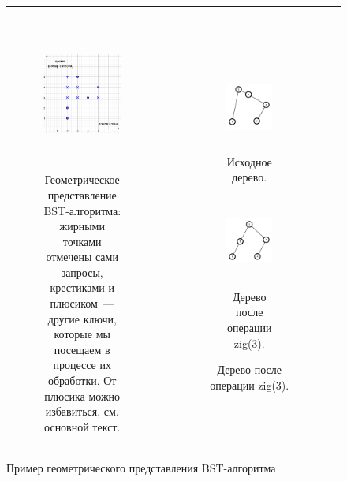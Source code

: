 \begin{figure}
	\centering
	\begin{tabular}{cc}

		\begin{subfigure}{0.6\textwidth}
			\centering
			\includegraphics[height=5cm]{img/graph_repr_example.png}
			\caption{Геометрическое представление BST-алгоритма: жирными точками отмечены сами запросы, крестиками и плюсиком~--- другие ключи, которые мы посещаем в процессе их обработки. От плюсика можно избавиться, см. основной текст.}
			\label{repr_example_graph}
		\end{subfigure}

		 &

		\begin{subfigure}{0.4\textwidth}
			\centering
			\begin{subfigure}{0.4\textwidth}
				\includegraphics[height=3cm]{img/tree_original.png}
				\caption{Исходное дерево.}
				\label{repr_example_orig}
			\end{subfigure}

			\begin{subfigure}{0.4\textwidth}
				\includegraphics[height=3cm]{img/tree_rebuild.png}
				\caption{Дерево после операции \textrm{zig(3)}.}
				\label{repr_example_rebuild}
			\end{subfigure}
		\end{subfigure}

		\\
	\end{tabular}
	\caption{Пример геометрического представления BST-алгоритма}
	\label{repr_example}
\end{figure}

